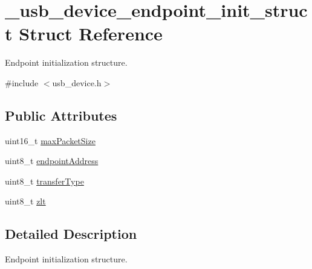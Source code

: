 \hypertarget{struct__usb__device__endpoint__init__struct}{\section{\-\_\-usb\-\_\-device\-\_\-endpoint\-\_\-init\-\_\-struct Struct Reference}
\label{struct__usb__device__endpoint__init__struct}
}


Endpoint initialization structure.  




{\ttfamily \#include $<$usb\-\_\-device.\-h$>$}

\subsection*{Public Attributes}
\begin{DoxyCompactItemize}
\item 
uint16\-\_\-t \hyperlink{struct__usb__device__endpoint__init__struct_ac74a64c8426572b311b92563ee2b7281}{max\-Packet\-Size}
\item 
uint8\-\_\-t \hyperlink{struct__usb__device__endpoint__init__struct_abcdb8047c5cde8b05cf95f1fc6334d4f}{endpoint\-Address}
\item 
uint8\-\_\-t \hyperlink{struct__usb__device__endpoint__init__struct_a5765c424230ffaba255cdca3566b0e0f}{transfer\-Type}
\item 
uint8\-\_\-t \hyperlink{struct__usb__device__endpoint__init__struct_afdac990e52df83bbd619e092039b13fd}{zlt}
\end{DoxyCompactItemize}


\subsection{Detailed Description}
Endpoint initialization structure. 

